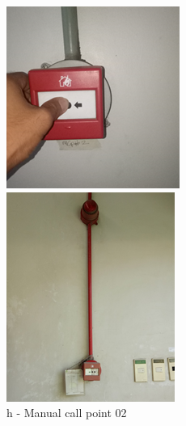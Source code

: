 \begin{figure}[!h]
\begin{minipage}[b]{0.22\linewidth}
		\includegraphics[width=\textwidth]{figures/ch05_fdas_mcp02}
		\caption*{h - Manual call point 02}
	\end{minipage}
	\hspace{0.03cm}
	\begin{minipage}[b]{0.22\linewidth}
		\centering
		\includegraphics[width=\textwidth]{figures/ch05_fdas_buzzer01}

\end{minipage}
\end{figure}
